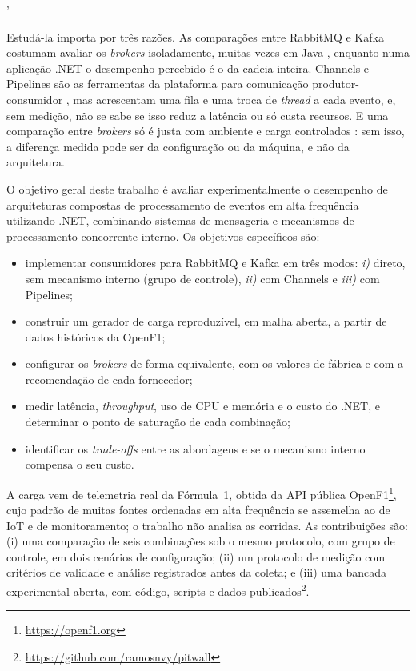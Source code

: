 '\documentclass[12pt]{article}
\begin{document}
Estudá-la importa por três razões. As comparações entre RabbitMQ e Kafka costumam avaliar
os \textit{brokers} isoladamente, muitas vezes em Java \cite{dobbelaere:2017,kaminski:2025},
enquanto numa aplicação .NET o desempenho percebido é o da cadeia inteira. Channels e
Pipelines são as ferramentas da plataforma para comunicação produtor-consumidor
\cite{microsoft:channels,microsoft:pipelines}, mas acrescentam uma fila e uma troca de
\textit{thread} a cada evento, e, sem medição, não se sabe se isso reduz a latência ou só custa
recursos. E uma comparação entre \textit{brokers} só é justa com ambiente e carga controlados
\cite{fu:2021}: sem isso, a diferença medida pode ser da configuração ou da máquina, e não
da arquitetura.

O objetivo geral deste trabalho é avaliar experimentalmente o desempenho de arquiteturas
compostas de processamento de eventos em alta frequência utilizando .NET, combinando
sistemas de mensageria e mecanismos de processamento concorrente interno. Os objetivos
específicos são:

\begin{itemize}
  \item implementar consumidores para RabbitMQ e Kafka em três modos: \textit{i)} direto, sem
        mecanismo interno (grupo de controle), \textit{ii)} com Channels e \textit{iii)} com Pipelines;
  \item construir um gerador de carga reproduzível, em malha aberta, a partir de dados
        históricos da OpenF1;
  \item configurar os \textit{brokers} de forma equivalente, com os valores de fábrica e com a
        recomendação de cada fornecedor;
  \item medir latência, \textit{throughput}, uso de CPU e memória e o custo do .NET, e determinar
        o ponto de saturação de cada combinação;
  \item identificar os \textit{trade-offs} entre as abordagens e se o mecanismo interno compensa
        o seu custo.
\end{itemize}

A carga vem de telemetria real da Fórmula~1, obtida da API pública
OpenF1\footnote{\url{https://openf1.org}}, cujo padrão de muitas fontes ordenadas em alta
frequência se assemelha ao de IoT e de monitoramento; o trabalho não analisa as corridas.
As contribuições são: (i) uma comparação de seis combinações sob o mesmo protocolo, com
grupo de controle, em dois cenários de configuração; (ii) um protocolo de medição com
critérios de validade e análise registrados antes da coleta; e (iii) uma bancada
experimental aberta, com código, scripts e dados
publicados\footnote{\url{https://github.com/ramosnvy/pitwall}}.
\end{document}
